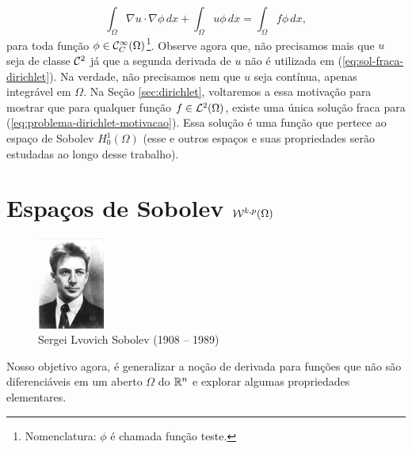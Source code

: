 \begin{equation} \label{eq:sol-fraca-dirichlet}
    \int_{\Omega} \nabla u \cdot \nabla \phi \,dx + \int_\Omega u\phi \,dx = \int_\Omega f \phi \,dx,
\end{equation}
para toda função $\phi \in \mathcal{C}^{\infty}_C(\Omega)$\footnote{Nomenclatura: $\phi$ é chamada função teste.}.
Observe agora que, não precisamos mais que $u$ seja de classe $\mathcal{C}^2$ já que a segunda derivada de $u$ não é utilizada em (\ref{eq:sol-fraca-dirichlet}). Na verdade, não precisamos nem que $u$ seja contínua, apenas integrável em $\Omega$.
Na Seção \ref{sec:dirichlet}, voltaremos a essa motivação para mostrar que para qualquer função $f \in \mathcal{L}^2(\Omega)$, existe uma única solução fraca para (\ref{eq:problema-dirichlet-motivacao}). 
Essa solução é uma função que pertece ao espaço de Sobolev $H^1_0(\Omega)$ (esse e outros espaços e suas propriedades serão estudadas ao longo desse trabalho).


\section{Espaços de Sobolev $\mathcal{W}^{k,p}(\Omega)$}

\begin{figure}
    \centering
    \includegraphics[height=3cm]{sobolev.jpg}
    \caption{Sergei Lvovich Sobolev (1908 -- 1989)}
\end{figure}

Nosso objetivo agora, é generalizar a noção de derivada para funções que não são diferenciáveis em um aberto $\Omega$ do $\mathbb{R}^n$ e explorar algumas propriedades elementares.

